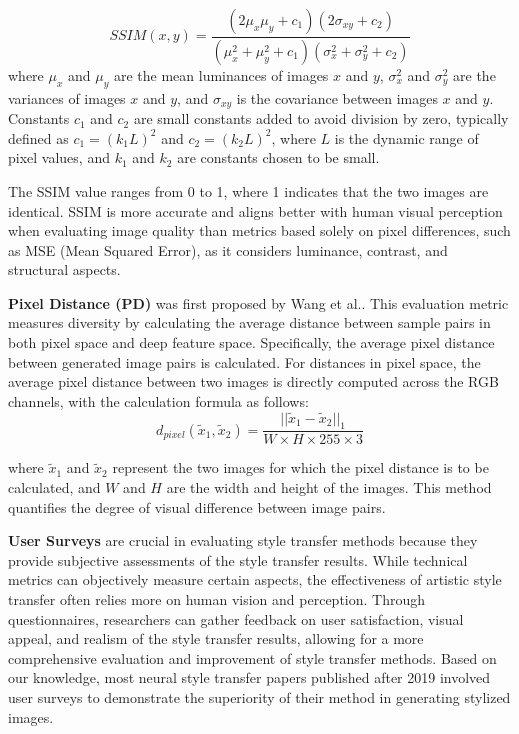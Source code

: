 \begin{equation}
    SSIM(x, y) = \frac{(2\mu_x\mu_y + c_1)(2\sigma_{xy} + c_2)}{(\mu_x^2 + \mu_y^2 + c_1)(\sigma_x^2 + \sigma_y^2 + c_2)}
\end{equation}
where $\mu_x$ and $\mu_y$ are the mean luminances of images $x$ and $y$, $\sigma_x^2$ and $\sigma_y^2$ are the variances of images $x$ and $y$, and $\sigma_{xy}$ is the covariance between images $x$ and $y$. Constants $c_1$ and $c_2$ are small constants added to avoid division by zero, typically defined as $c_1=(k_1 L)^2$ and $c_2=(k_2 L)^2$, where $L$ is the dynamic range of pixel values, and $k_1$ and $k_2$ are constants chosen to be small.

The SSIM value ranges from 0 to 1, where 1 indicates that the two images are identical. SSIM is more accurate and aligns better with human visual perception when evaluating image quality than metrics based solely on pixel differences, such as MSE (Mean Squared Error), as it considers luminance, contrast, and structural aspects.

\textbf{Pixel Distance (PD)} was first proposed by Wang et al.\citep{76wang2020diversified}. This evaluation metric measures diversity by calculating the average distance between sample pairs in both pixel space and deep feature space. Specifically, the average pixel distance between generated image pairs is calculated. For distances in pixel space, the average pixel distance between two images is directly computed across the RGB channels, with the calculation formula as follows:
\begin{equation}
    d_{pixel}(\tilde{x}_1, \tilde{x}_2) = \frac{||\tilde{x}_1 - \tilde{x}_2||_1}{W \times H \times 255 \times 3}
\end{equation}

where $\tilde{x}_1$ and $\tilde{x}_2$ represent the two images for which the pixel distance is to be calculated, and $W$ and $H$ are the width and height of the images. This method quantifies the degree of visual difference between image pairs.

\textbf{User Surveys} are crucial in evaluating style transfer methods because they provide subjective assessments of the style transfer results. While technical metrics can objectively measure certain aspects, the effectiveness of artistic style transfer often relies more on human vision and perception. Through questionnaires, researchers can gather feedback on user satisfaction, visual appeal, and realism of the style transfer results, allowing for a more comprehensive evaluation and improvement of style transfer methods. Based on our knowledge, most neural style transfer papers published after 2019 involved user surveys to demonstrate the superiority of their method in generating stylized images.

